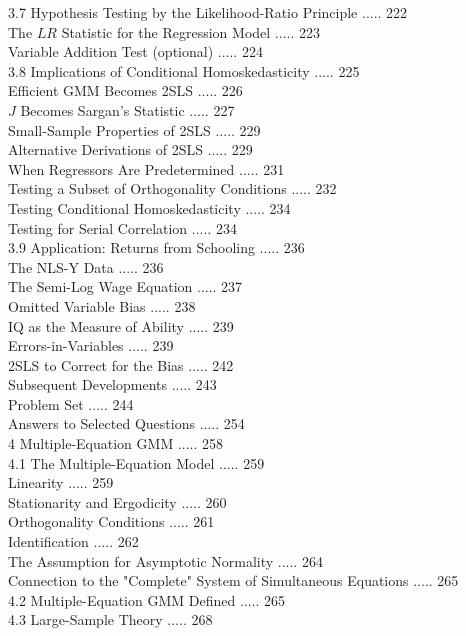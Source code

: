 \documentclass[10pt]{article}
\begin{document}
3.7 Hypothesis Testing by the Likelihood-Ratio Principle ..... 222\\
The $L R$ Statistic for the Regression Model ..... 223\\
Variable Addition Test (optional) ..... 224\\
3.8 Implications of Conditional Homoskedasticity ..... 225\\
Efficient GMM Becomes 2SLS ..... 226\\
$J$ Becomes Sargan's Statistic ..... 227\\
Small-Sample Properties of 2SLS ..... 229\\
Alternative Derivations of 2SLS ..... 229\\
When Regressors Are Predetermined ..... 231\\
Testing a Subset of Orthogonality Conditions ..... 232\\
Testing Conditional Homoskedasticity ..... 234\\
Testing for Serial Correlation ..... 234\\
3.9 Application: Returns from Schooling ..... 236\\
The NLS-Y Data ..... 236\\
The Semi-Log Wage Equation ..... 237\\
Omitted Variable Bias ..... 238\\
IQ as the Measure of Ability ..... 239\\
Errors-in-Variables ..... 239\\
2SLS to Correct for the Bias ..... 242\\
Subsequent Developments ..... 243\\
Problem Set ..... 244\\
Answers to Selected Questions ..... 254\\
4 Multiple-Equation GMM ..... 258\\
4.1 The Multiple-Equation Model ..... 259\\
Linearity ..... 259\\
Stationarity and Ergodicity ..... 260\\
Orthogonality Conditions ..... 261\\
Identification ..... 262\\
The Assumption for Asymptotic Normality ..... 264\\
Connection to the "Complete" System of Simultaneous Equations ..... 265\\
4.2 Multiple-Equation GMM Defined ..... 265\\
4.3 Large-Sample Theory ..... 268\\
\end{document}
